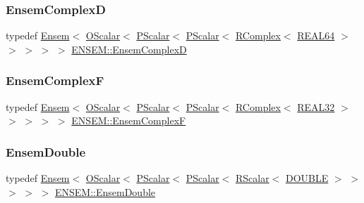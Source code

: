 \mbox{\label{group__defs_gaa1c62d46cc410553bbcb87757e212505}} 
\subsubsection{\texorpdfstring{EnsemComplexD}{EnsemComplexD}}
{\footnotesize\ttfamily typedef \mbox{\hyperlink{classENSEM_1_1Ensem}{Ensem}}$<$ \mbox{\hyperlink{classENSEM_1_1OScalar}{O\+Scalar}}$<$ \mbox{\hyperlink{classENSEM_1_1PScalar}{P\+Scalar}}$<$ \mbox{\hyperlink{classENSEM_1_1PScalar}{P\+Scalar}}$<$ \mbox{\hyperlink{classENSEM_1_1RComplex}{R\+Complex}}$<$ \mbox{\hyperlink{namespaceENSEM_a85b215b9f1f43715aebee01718e25082}{R\+E\+A\+L64}} $>$ $>$ $>$ $>$ $>$ \mbox{\hyperlink{group__defs_gaa1c62d46cc410553bbcb87757e212505}{E\+N\+S\+E\+M\+::\+Ensem\+ComplexD}}}

\mbox{\label{group__defs_gaac62e751aea40f9e3423a058ca20c7c9}} 
\subsubsection{\texorpdfstring{EnsemComplexF}{EnsemComplexF}}
{\footnotesize\ttfamily typedef \mbox{\hyperlink{classENSEM_1_1Ensem}{Ensem}}$<$ \mbox{\hyperlink{classENSEM_1_1OScalar}{O\+Scalar}}$<$ \mbox{\hyperlink{classENSEM_1_1PScalar}{P\+Scalar}}$<$ \mbox{\hyperlink{classENSEM_1_1PScalar}{P\+Scalar}}$<$ \mbox{\hyperlink{classENSEM_1_1RComplex}{R\+Complex}}$<$ \mbox{\hyperlink{namespaceENSEM_a7540d01191172323e9073283d772576d}{R\+E\+A\+L32}} $>$ $>$ $>$ $>$ $>$ \mbox{\hyperlink{group__defs_gaac62e751aea40f9e3423a058ca20c7c9}{E\+N\+S\+E\+M\+::\+Ensem\+ComplexF}}}

\mbox{\label{group__defs_gac42383c5825ab6504a44fe73b73027ad}} 
\subsubsection{\texorpdfstring{EnsemDouble}{EnsemDouble}}
{\footnotesize\ttfamily typedef \mbox{\hyperlink{classENSEM_1_1Ensem}{Ensem}}$<$ \mbox{\hyperlink{classENSEM_1_1OScalar}{O\+Scalar}}$<$ \mbox{\hyperlink{classENSEM_1_1PScalar}{P\+Scalar}}$<$ \mbox{\hyperlink{classENSEM_1_1PScalar}{P\+Scalar}}$<$ \mbox{\hyperlink{classENSEM_1_1RScalar}{R\+Scalar}}$<$ \mbox{\hyperlink{namespaceENSEM_adcbd0de4e9e0e7ef6aa9b681a554e2c5}{D\+O\+U\+B\+LE}} $>$ $>$ $>$ $>$ $>$ \mbox{\hyperlink{group__defs_gac42383c5825ab6504a44fe73b73027ad}{E\+N\+S\+E\+M\+::\+Ensem\+Double}}}

